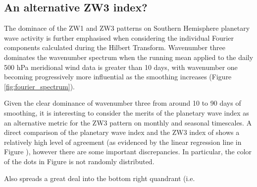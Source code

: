 \subsection{An alternative ZW3 index?}

The dominace of the ZW1 and ZW3 patterns on Southern Hemisphere planetary wave activity is further emphasised when considering the individual Fourier components calculated during the Hilbert Transform. Wavenumber three dominates the wavenumber spectrum when the running mean applied to the daily 500 hPa meridional wind data is greater than 10 days, with wavenumber one becoming progressively more influential as the smoothing increases (Figure \ref{fig:fourier_spectrum}).

Given the clear dominance of wavenumber three from around 10 to 90 days of smoothing, it is interesting to consider the merits of the planetary wave index as an alternative metric for the ZW3 pattern on monthly and seasonal timescales. A direct comparison of the planetary wave index and the ZW3 index of \citet{Raphael2004} shows a relatively high level of agreement (as evidenced by the linear regression line in Figure \label{fig:metric_vs_zw3}), however there are some important discrepancies. In particular, the color of the dots in Figure \label{fig:metric_vs_zw3} is not randomly distributed.

Also spreads a great deal into the bottom right quandrant (i.e.  



